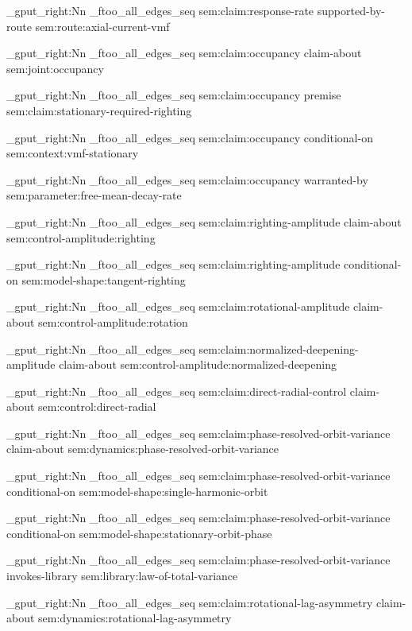\seq_gput_right:Nn \g_ftoo_all_edges_seq { { sem:claim:response-rate } { supported-by-route } { sem:route:axial-current-vmf } }

\seq_gput_right:Nn \g_ftoo_all_edges_seq { { sem:claim:occupancy } { claim-about } { sem:joint:occupancy } }

\seq_gput_right:Nn \g_ftoo_all_edges_seq { { sem:claim:occupancy } { premise } { sem:claim:stationary-required-righting } }

\seq_gput_right:Nn \g_ftoo_all_edges_seq { { sem:claim:occupancy } { conditional-on } { sem:context:vmf-stationary } }

\seq_gput_right:Nn \g_ftoo_all_edges_seq { { sem:claim:occupancy } { warranted-by } { sem:parameter:free-mean-decay-rate } }

\seq_gput_right:Nn \g_ftoo_all_edges_seq { { sem:claim:righting-amplitude } { claim-about } { sem:control-amplitude:righting } }

\seq_gput_right:Nn \g_ftoo_all_edges_seq { { sem:claim:righting-amplitude } { conditional-on } { sem:model-shape:tangent-righting } }

\seq_gput_right:Nn \g_ftoo_all_edges_seq { { sem:claim:rotational-amplitude } { claim-about } { sem:control-amplitude:rotation } }

\seq_gput_right:Nn \g_ftoo_all_edges_seq { { sem:claim:normalized-deepening-amplitude } { claim-about } { sem:control-amplitude:normalized-deepening } }

\seq_gput_right:Nn \g_ftoo_all_edges_seq { { sem:claim:direct-radial-control } { claim-about } { sem:control:direct-radial } }

\seq_gput_right:Nn \g_ftoo_all_edges_seq { { sem:claim:phase-resolved-orbit-variance } { claim-about } { sem:dynamics:phase-resolved-orbit-variance } }

\seq_gput_right:Nn \g_ftoo_all_edges_seq { { sem:claim:phase-resolved-orbit-variance } { conditional-on } { sem:model-shape:single-harmonic-orbit } }

\seq_gput_right:Nn \g_ftoo_all_edges_seq { { sem:claim:phase-resolved-orbit-variance } { conditional-on } { sem:model-shape:stationary-orbit-phase } }

\seq_gput_right:Nn \g_ftoo_all_edges_seq { { sem:claim:phase-resolved-orbit-variance } { invokes-library } { sem:library:law-of-total-variance } }

\seq_gput_right:Nn \g_ftoo_all_edges_seq { { sem:claim:rotational-lag-asymmetry } { claim-about } { sem:dynamics:rotational-lag-asymmetry } }

